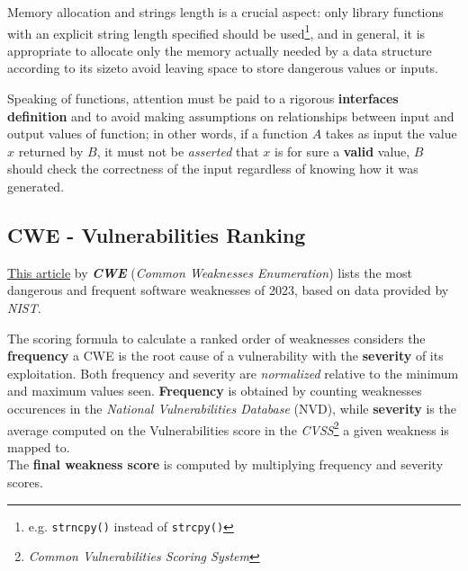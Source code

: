 Memory allocation and strings length is a crucial aspect:
only library functions with an explicit string length specified should be used\footnote{e.g. \lstinline|strncpy()| instead of \lstinline|strcpy()|},
and in general,
it is appropriate to
allocate only the memory actually needed by a data structure according to its sizeto avoid leaving
space to store dangerous values or inputs.\nl

Speaking of functions,
attention must be paid to a rigorous \textbf{interfaces definition} and to avoid making assumptions on relationships between input and output values of function;
in other words, if a function $A$ takes as input the value $x$ returned by $B$,
it must not be \textit{asserted} that $x$ is for sure a \textbf{valid} value,
$B$ should check the correctness of the input regardless of knowing how it was generated.

\subsection{CWE - Vulnerabilities Ranking}
\href{https://cwe.mitre.org/top25/archive/2023/2023_top25_list.html#tableView}{This article} by \textit{\textbf{CWE}} (\textit{Common Weaknesses Enumeration}) lists the most dangerous and frequent software weaknesses of 2023,
based on data provided by \textit{NIST}.

The scoring formula to calculate a ranked order of weaknesses
considers the \textbf{frequency} a CWE is the root cause of a vulnerability
with the \textbf{severity} of its exploitation. Both frequency and severity are
\textit{normalized} relative to the minimum and maximum values seen.
\textbf{Frequency} is obtained by counting weaknesses occurences in the \textit{National Vulnerabilities Database} (NVD),
while \textbf{severity} is the average computed on the Vulnerabilities score in the \textit{CVSS}\footnote{\textit{Common Vulnerabilities Scoring System}} a given weakness is mapped to.\\
The \textbf{final weakness score} is computed by multiplying frequency and severity scores.

